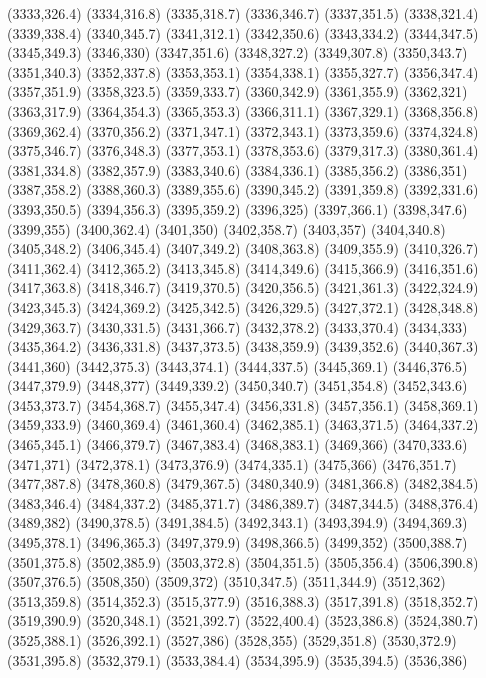 (3333,326.4)
(3334,316.8)
(3335,318.7)
(3336,346.7)
(3337,351.5)
(3338,321.4)
(3339,338.4)
(3340,345.7)
(3341,312.1)
(3342,350.6)
(3343,334.2)
(3344,347.5)
(3345,349.3)
(3346,330)
(3347,351.6)
(3348,327.2)
(3349,307.8)
(3350,343.7)
(3351,340.3)
(3352,337.8)
(3353,353.1)
(3354,338.1)
(3355,327.7)
(3356,347.4)
(3357,351.9)
(3358,323.5)
(3359,333.7)
(3360,342.9)
(3361,355.9)
(3362,321)
(3363,317.9)
(3364,354.3)
(3365,353.3)
(3366,311.1)
(3367,329.1)
(3368,356.8)
(3369,362.4)
(3370,356.2)
(3371,347.1)
(3372,343.1)
(3373,359.6)
(3374,324.8)
(3375,346.7)
(3376,348.3)
(3377,353.1)
(3378,353.6)
(3379,317.3)
(3380,361.4)
(3381,334.8)
(3382,357.9)
(3383,340.6)
(3384,336.1)
(3385,356.2)
(3386,351)
(3387,358.2)
(3388,360.3)
(3389,355.6)
(3390,345.2)
(3391,359.8)
(3392,331.6)
(3393,350.5)
(3394,356.3)
(3395,359.2)
(3396,325)
(3397,366.1)
(3398,347.6)
(3399,355)
(3400,362.4)
(3401,350)
(3402,358.7)
(3403,357)
(3404,340.8)
(3405,348.2)
(3406,345.4)
(3407,349.2)
(3408,363.8)
(3409,355.9)
(3410,326.7)
(3411,362.4)
(3412,365.2)
(3413,345.8)
(3414,349.6)
(3415,366.9)
(3416,351.6)
(3417,363.8)
(3418,346.7)
(3419,370.5)
(3420,356.5)
(3421,361.3)
(3422,324.9)
(3423,345.3)
(3424,369.2)
(3425,342.5)
(3426,329.5)
(3427,372.1)
(3428,348.8)
(3429,363.7)
(3430,331.5)
(3431,366.7)
(3432,378.2)
(3433,370.4)
(3434,333)
(3435,364.2)
(3436,331.8)
(3437,373.5)
(3438,359.9)
(3439,352.6)
(3440,367.3)
(3441,360)
(3442,375.3)
(3443,374.1)
(3444,337.5)
(3445,369.1)
(3446,376.5)
(3447,379.9)
(3448,377)
(3449,339.2)
(3450,340.7)
(3451,354.8)
(3452,343.6)
(3453,373.7)
(3454,368.7)
(3455,347.4)
(3456,331.8)
(3457,356.1)
(3458,369.1)
(3459,333.9)
(3460,369.4)
(3461,360.4)
(3462,385.1)
(3463,371.5)
(3464,337.2)
(3465,345.1)
(3466,379.7)
(3467,383.4)
(3468,383.1)
(3469,366)
(3470,333.6)
(3471,371)
(3472,378.1)
(3473,376.9)
(3474,335.1)
(3475,366)
(3476,351.7)
(3477,387.8)
(3478,360.8)
(3479,367.5)
(3480,340.9)
(3481,366.8)
(3482,384.5)
(3483,346.4)
(3484,337.2)
(3485,371.7)
(3486,389.7)
(3487,344.5)
(3488,376.4)
(3489,382)
(3490,378.5)
(3491,384.5)
(3492,343.1)
(3493,394.9)
(3494,369.3)
(3495,378.1)
(3496,365.3)
(3497,379.9)
(3498,366.5)
(3499,352)
(3500,388.7)
(3501,375.8)
(3502,385.9)
(3503,372.8)
(3504,351.5)
(3505,356.4)
(3506,390.8)
(3507,376.5)
(3508,350)
(3509,372)
(3510,347.5)
(3511,344.9)
(3512,362)
(3513,359.8)
(3514,352.3)
(3515,377.9)
(3516,388.3)
(3517,391.8)
(3518,352.7)
(3519,390.9)
(3520,348.1)
(3521,392.7)
(3522,400.4)
(3523,386.8)
(3524,380.7)
(3525,388.1)
(3526,392.1)
(3527,386)
(3528,355)
(3529,351.8)
(3530,372.9)
(3531,395.8)
(3532,379.1)
(3533,384.4)
(3534,395.9)
(3535,394.5)
(3536,386)
